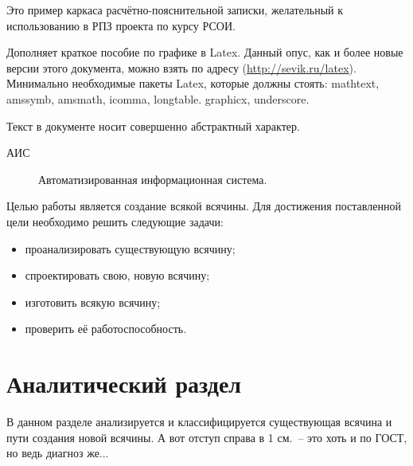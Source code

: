 \documentclass[utf8]{G7-32} %
\begin{document}
\frontmatter %

\Referat
Это пример каркаса расчётно-пояснительной записки, желательный к использованию в РПЗ проекта по курсу РСОИ.

Дополняет краткое пособие по графике в Latex.  Данный опус, как и более новые версии этого документа, можно взять по адресу (\url{http://sevik.ru/latex}). Минимально необходимые пакеты Latex, которые должны стоять: mathtext, amssymb, amsmath, icomma, longtable. graphicx, underscore.

Текст в документе носит совершенно абстрактный характер.

\tableofcontents


\Abbreviations %
\begin{description}
\item[АИС] Автоматизированная информационная система.
\end{description}

\Introduction

Целью работы является создание всякой всячины. Для достижения поставленной цели необходимо решить следующие задачи:
%
\begin{itemize}
\item проанализировать существующую всячину;
\item спроектировать свою, новую всячину;
\item изготовить всякую всячину;
\item проверить её работоспособность.
\end{itemize}

\mainmatter %

\chapter{Аналитический раздел}
%
%
В данном разделе анализируется и классифицируется существующая всячина и пути создания новой всячины. А вот отступ справа в 1 см.~-- это хоть и по ГОСТ, но ведь диагноз же...
\end{document}
